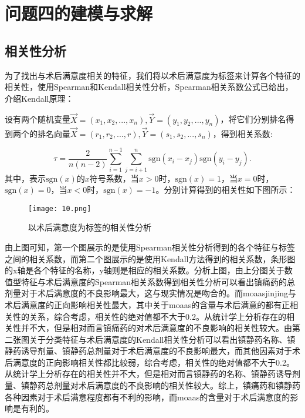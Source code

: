 \section{问题四的建模与求解}

\subsection{相关性分析}

为了找出与术后满意度相关的特征，我们将以术后满意度为标签来计算各个特征的相关性，使用Spearman和Kendall相关性分析，Spearman相关系数公式已给出，介绍Kendall原理：

设有两个随机变量$\overrightarrow{X}=\left( {{x}_{1}},{{x}_{2}},...,{{x}_{n}} \right),\overrightarrow{Y}=\left( {{y}_{1}},{{y}_{2}},...,{{y}_{n}} \right)$，将它们分别排名得到两个的排名向量$\overrightarrow{X}=\left( {{r}_{1}},{{r}_{2}},...,r \right),\overrightarrow{Y}=\left( {{s}_{1}},{{s}_{2}},...,{{s}_{n}} \right)$，得到相关系数:

\begin{equation}
    \tau = \dfrac{2}{n(n-2)}\sum_{i=1}^{n-1}\sum_{j=i+1}^{n}\text{sgn}{(x_i-x_j)}\text{sgn}{(y_i-y_j)}.
\end{equation}
其中，表示$\text{sgn}(x)$的$x$符号系数，当$x>0$时，$\text{sgn}(x)=1$，当$x=0$时，$\text{sgn}(x)=0$，当$x<0$时，$\text{sgn}(x)=-1$。分别计算得到的相关性如下图所示：

\begin{figure}[H] %
	\centering %
	\texttt{[image: 10.png]} 
	\label{Fig.main10} 
    \caption{以术后满意度为标签的相关性分析}
\end{figure}


由上图可知，第一个图展示的是使用Spearman相关性分析得到的各个特征与标签之间的相关系数，而第二个图展示的是使用Kendall方法得到的相关系数，条形图的x轴是各个特征的名称，y轴则是相应的相关系数。分析上图，由上分图关于数值型特征与术后满意度的Spearman相关系数得到相关性分析可以看出镇痛药的总剂量对于术后满意度的不良影响最大，这与现实情况是吻合的。而moaasjinjing与术后满意度的正向影响相关性最大，其中关于moaas的含量与术后满意的都有正相关性的关系，综合考虑，相关性的绝对值都不大于0.2。从统计学上分析存在的相关性并不大，但是相对而言镇痛药的对术后满意度的不良影响的相关性较大。由第二张图关于分类特征与术后满意度的Kendall相关性分析可以看出镇静药名称、镇静药诱导剂量、镇静药总剂量对于术后满意度的不良影响最大，而其他因素对于术后满意度的正向影响相关性都比较弱，综合考虑，相关性的绝对值都不大于0.2。从统计学上分析存在的相关性并不大，但是相对而言镇静药的名称、镇静药诱导剂量、镇静药总剂量对术后满意度的不良影响的相关性较大。综上，镇痛药和镇静药各种因素对于术后满意程度都有不利的影响，而moaas的含量对于术后满意度的影响是有利的。


